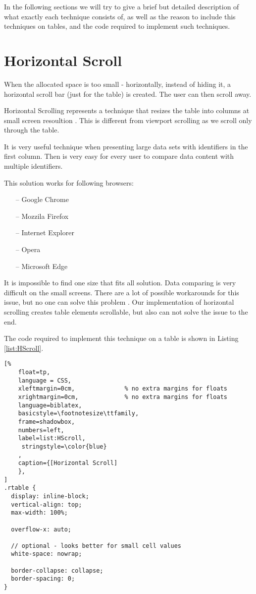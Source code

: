 In the following sections we will try to give a brief but detailed
description of what exactly each technique consists of, as well as the
reason to include this techniques on tables, and the code required to
implement such techniques.

\section{Horizontal Scroll}
When the allocated space is too small - horizontally, instead of
hiding it, a horizontal scroll bar (just for the table) is created.
The user can then scroll away.

Horizontal Scrolling represents a technique that resizes the table
into columns at small screen resoultion \parencite{HS_1}. 
This is different from viewport scrolling as we scroll only through 
the table.

It is very useful technique when presenting large data
 sets with identifiers in the first column. Then is very easy for 
 every user to compare data content with 
 multiple identifiers\parencite{HS}.

This solution works for following browsers:
\begin{itemize}
    \item[--] Google Chrome
    \item[--] Mozzila Firefox
    \item[--] Internet Explorer
    \item[--] Opera
    \item[--] Microsoft Edge
\end{itemize}

It is impossible to find one size that fits all solution. Data 
comparing is very difficult on the small screens.
There are a lot of possible workarounds for this issue, but no 
one can solve this problem \parencite{HS_1}.
Our implementation of horizontal scrolling creates table elements
 scrollable, but also can not solve the issue 
 to the end\parencite{HS_1}.

The code required to implement this technique 
on a table is shown in Listing \ref{list:HScroll}.

\begin{lstlisting}[%
    float=tp,
    language = CSS,
    xleftmargin=0cm,              % no extra margins for floats
    xrightmargin=0cm,             % no extra margins for floats
    language=biblatex,
    basicstyle=\footnotesize\ttfamily,
    frame=shadowbox,
    numbers=left,
    label=list:HScroll,
     stringstyle=\color{blue}
    ,
    caption={[Horizontal Scroll]
    },
]
.rtable {
  display: inline-block;
  vertical-align: top;
  max-width: 100%;

  overflow-x: auto;

  // optional - looks better for small cell values
  white-space: nowrap;

  border-collapse: collapse;
  border-spacing: 0;
}

\end{lstlisting}

